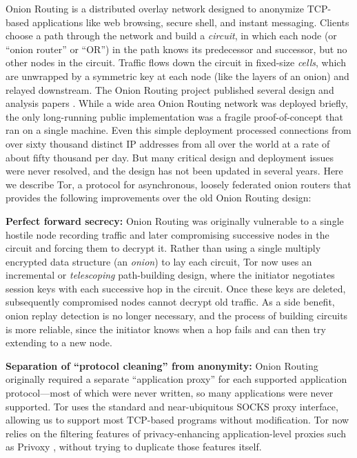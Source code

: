 \documentclass[times,10pt,twocolumn]{article}
\begin{document}
Onion Routing is a distributed overlay network designed to anonymize
TCP-based applications like web browsing, secure shell,
and instant messaging. Clients choose a path through the network and
build a \emph{circuit}, in which each node (or ``onion router'' or ``OR'')
in the path knows its predecessor and successor, but no other nodes in
the circuit.  Traffic flows down the circuit in fixed-size
\emph{cells}, which are unwrapped by a symmetric key at each node
(like the layers of an onion) and relayed downstream. The
Onion Routing project published several design and analysis papers
\cite{or-ih96,or-jsac98,or-discex00,or-pet00}. While a wide area Onion
Routing network was deployed briefly, the only long-running
public implementation was a fragile
proof-of-concept that ran on a single machine. Even this simple deployment
processed connections from over sixty thousand distinct IP addresses from
all over the world at a rate of about fifty thousand per day.
But many critical design and deployment issues were never
resolved, and the design has not been updated in several years. Here
we describe Tor, a protocol for asynchronous, loosely federated onion
routers that provides the following improvements over the old Onion
Routing design:

\textbf{Perfect forward secrecy:} Onion Routing
was originally vulnerable to a single hostile node recording traffic and
later compromising successive nodes in the circuit and forcing them
to decrypt it. Rather than using a single multiply encrypted data
structure (an \emph{onion}) to lay each circuit,
Tor now uses an incremental or \emph{telescoping} path-building design,
where the initiator negotiates session keys with each successive hop in
the circuit.  Once these keys are deleted, subsequently compromised nodes
cannot decrypt old traffic.  As a side benefit, onion replay detection
is no longer necessary, and the process of building circuits is more
reliable, since the initiator knows when a hop fails and can then try
extending to a new node.

\textbf{Separation of ``protocol cleaning'' from anonymity:}
Onion Routing originally required a separate ``application
proxy'' for each supported application protocol---most of which were
never written, so many applications were never supported.  Tor uses the
standard and near-ubiquitous SOCKS \cite{socks4} proxy interface, allowing
us to support most TCP-based programs without modification.  Tor now
relies on the filtering features of privacy-enhancing
application-level proxies such as Privoxy \cite{privoxy}, without trying
to duplicate those features itself.
\end{document}
